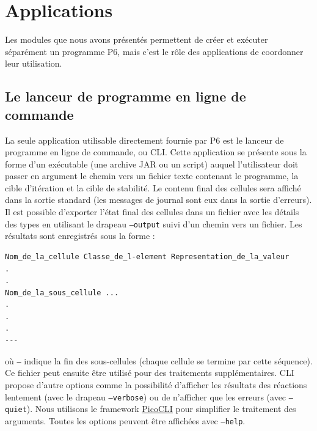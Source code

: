 \documentclass[a4paper, 12pt]{article}
\newcommand{\inline}[1]{\texttt{#1}}
\begin{document}
\section{Applications}
Les modules que nous avons présentés permettent de créer et exécuter séparément un programme P6, mais c’est le rôle des applications de coordonner leur utilisation.

\subsection{Le lanceur de programme en ligne de commande}
La seule application utilisable directement fournie par P6 est le lanceur de programme en ligne de commande, ou CLI. Cette application se présente sous la forme d’un exécutable (une archive JAR ou un script) auquel l’utilisateur doit passer en argument le chemin vers un fichier texte contenant le programme, la cible d’itération et la cible de stabilité. Le contenu final des cellules sera affiché dans la sortie standard (les messages de journal sont eux dans la sortie d’erreurs). Il est possible d’exporter l’état final des cellules dans un fichier avec les détails des types en utilisant le drapeau \inline{--output} suivi d’un chemin vers un fichier. Les résultats sont enregistrés sous la forme :

\begin{lstlisting}
Nom_de_la_cellule Classe_de_l-element Representation_de_la_valeur
.
.
Nom_de_la_sous_cellule ...
.
.
.
---
\end{lstlisting}

où \inline{---} indique la fin des sous-cellules (chaque cellule se termine par cette séquence). Ce fichier peut ensuite être utilisé pour des traitements supplémentaires.
CLI propose d’autre options comme la possibilité d’afficher les résultats des réactions lentement (avec le drapeau \inline{--verbose}) ou de n’afficher que les erreurs (avec \inline{--quiet}). Nous utilisons le framework \href{https://picocli.info/}{PicoCLI} pour simplifier le traitement des arguments. Toutes les options peuvent être affichées avec \inline{--help}.
\end{document}
